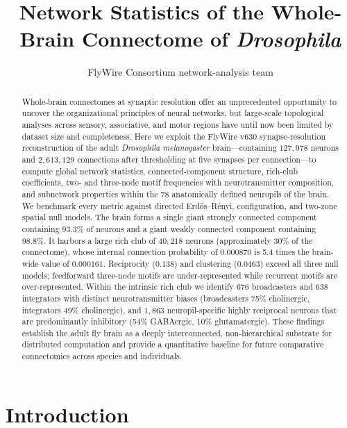 \documentclass[11pt]{article}
\title{Network Statistics of the Whole-Brain Connectome of \textit{Drosophila}}
\author{FlyWire Consortium network-analysis team}
\date{}
\begin{document}
\maketitle

\begin{abstract}
Whole-brain connectomes at synaptic resolution offer an unprecedented
opportunity to uncover the organizational principles of neural networks, but
large-scale topological analyses across sensory, associative, and motor
regions have until now been limited by dataset size and completeness. Here
we exploit the FlyWire v630 synapse-resolution reconstruction of the adult
\textit{Drosophila melanogaster} brain---containing $127{,}978$ neurons and
$2{,}613{,}129$ connections after thresholding at five synapses per
connection---to compute global network statistics, connected-component
structure, rich-club coefficients, two- and three-node motif frequencies
with neurotransmitter composition, and subnetwork properties within the 78
anatomically defined neuropils of the brain. We benchmark every metric
against directed Erd{\H o}s--R{\'e}nyi, configuration, and two-zone spatial
null models. The brain forms a single giant strongly connected component
containing 93.3\% of neurons and a giant weakly connected component
containing 98.8\%. It harbors a large rich club of $40{,}218$ neurons
(approximately 30\% of the connectome), whose internal connection
probability of $0.000870$ is 5.4 times the brain-wide value of $0.000161$.
Reciprocity ($0.138$) and clustering ($0.0463$) exceed all three null models;
feedforward three-node motifs are under-represented while recurrent motifs
are over-represented. Within the intrinsic rich club we identify 676
broadcasters and 638 integrators with distinct neurotransmitter biases
(broadcasters 75\% cholinergic, integrators 49\% cholinergic), and $1{,}863$
neuropil-specific highly reciprocal neurons that are predominantly inhibitory
(54\% GABAergic, 10\% glutamatergic). These findings establish the adult fly
brain as a deeply interconnected, non-hierarchical substrate for distributed
computation and provide a quantitative baseline for future comparative
connectomics across species and individuals.
\end{abstract}

\section{Introduction}
\end{document}
